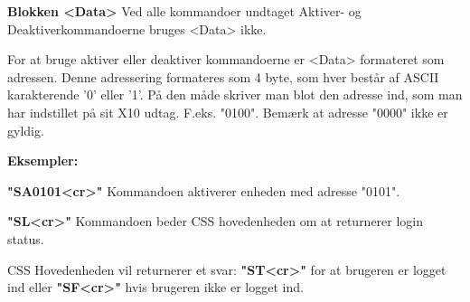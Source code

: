 \textbf{Blokken <Data>}
Ved alle kommandoer undtaget Aktiver- og Deaktiverkommandoerne bruges <Data> ikke.

For at bruge aktiver eller deaktiver kommandoerne er <Data> formateret som adressen. Denne adressering formateres som 4 byte, som hver består af ASCII karakterende '0' eller '1'. På den måde skriver man blot den adresse ind, som man har indstillet på sit X10 udtag. F.eks. "0100".
Bemærk at adresse "0000" ikke er gyldig.

\textbf{Eksempler:}

\textbf{"SA0101<cr>"}
Kommandoen aktiverer enheden med adresse "0101".

\textbf{"SL<cr>"}
Kommandoen beder CSS hovedenheden om at returnerer login status.

CSS Hovedenheden vil returnerer et svar:
\textbf{"ST<cr>"} for at brugeren er logget ind eller \textbf{"SF<cr>"} hvis brugeren ikke er logget ind.

